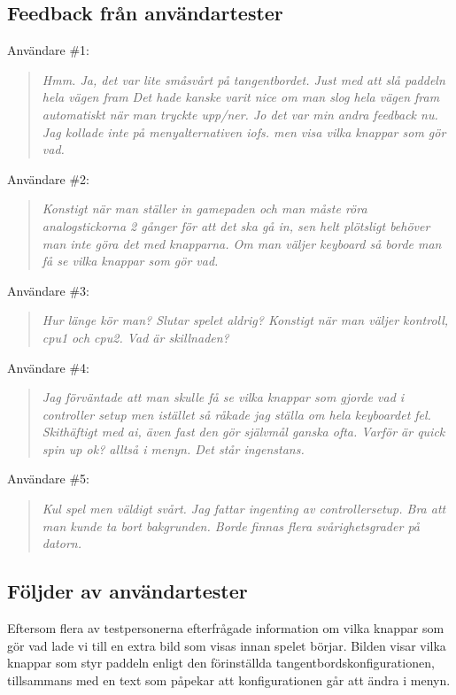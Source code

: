\documentclass[a4paper,11pt]{article}
\begin{document}
\bigskip
\noindent
\subsection{Feedback från användartester}
Användare \#1:
\begin{quote}
\textit{Hmm. Ja, det var lite småsvårt på tangentbordet. Just med att slå paddeln hela vägen fram
Det hade kanske varit nice om man slog hela vägen fram automatiskt när man tryckte upp/ner.
Jo det var min andra feedback nu. Jag kollade inte på menyalternativen iofs. men visa vilka knappar som gör vad.}
\end{quote}

\bigskip

Användare \#2:
\begin{quote}
\textit{Konstigt när man ställer in gamepaden och man måste röra analogstickorna 2 gånger för att det ska gå in, sen helt plötsligt behöver man inte göra det med knapparna.
Om man väljer keyboard så borde man få se vilka knappar som gör vad.}
\end{quote}

\bigskip

Användare \#3:
\begin{quote}
\textit{Hur länge kör man?
Slutar spelet aldrig?
Konstigt när man väljer kontroll, cpu1 och cpu2. Vad är skillnaden?}
\end{quote}

\bigskip

Användare \#4:
\begin{quote}
\textit{Jag förväntade att man skulle få se vilka knappar som gjorde vad i controller setup men istället så råkade jag ställa om hela keyboardet fel.
Skithäftigt med ai, även fast den gör självmål ganska ofta.
Varför är quick spin up ok? alltså i menyn. Det står ingenstans.}
\end{quote}

\bigskip

Användare \#5:
\begin{quote}
\textit{Kul spel men väldigt svårt. 
Jag fattar ingenting av controllersetup.
Bra att man kunde ta bort bakgrunden. 
Borde finnas flera svårighetsgrader på datorn.}
\end{quote}

\subsection{Följder av användartester}
Eftersom flera av testpersonerna efterfrågade information om vilka
knappar som gör vad lade vi till en extra bild som visas innan
spelet börjar. Bilden visar vilka knappar som styr paddeln enligt
den förinställda tangentbordskonfigurationen, tillsammans med en
text som påpekar att konfigurationen går att ändra i menyn.
\end{document}
